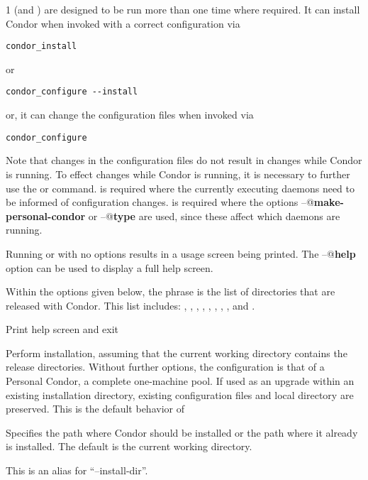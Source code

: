 \begin{ManPage}{\label{man-condor-configure}}{1}
 (and ) are designed to be run more
than one time where required.
It can install Condor when invoked with a correct configuration via
\begin{verbatim}
condor_install
\end{verbatim}
or 
\begin{verbatim}
condor_configure --install
\end{verbatim}
or, it can change the configuration files when invoked via
\begin{verbatim}
condor_configure
\end{verbatim}
Note that changes in the configuration files do not result
in changes while Condor is running.
To effect changes while Condor is running,
it is necessary to further use the  or 
command.
  is required where the currently executing
daemons need to be informed of configuration changes.
 is required where the options
\verb@--@\textbf{make-personal-condor} or
\verb@--@\textbf{type}
are used, since these affect which daemons are running.

Running  or  with no options results
in a usage screen being printed.
The \verb@--@\textbf{help} option can be used to display a full help screen.

Within the options given below, 
the phrase  is the list of directories that are
released with Condor.  This list includes: 
, , , ,
, , , ,
 and .

\begin{Options}
	 {Print help screen and exit}

	 {Perform installation, assuming that
	the current working directory contains the release directories.
	Without further options, the configuration is that of
	a Personal Condor, a complete one-machine pool.
	If used as an 
	upgrade within an existing installation directory, existing 
	configuration files and local directory are preserved.  This
	is the default behavior of }

	 {Specifies the path
	where Condor should be installed or the path where it already is
	installed. The default is the current working directory.}

	 {This is an alias for
	``--install-dir''.}


\end{Options}
\end{ManPage}
